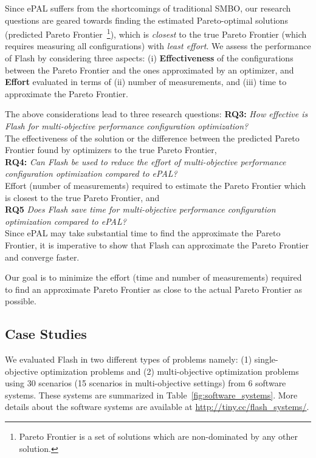 \documentclass[10pt,journal,compsoc]{IEEEtran}
\newcommand{\flash}{{\sc Flash}\xspace}
\begin{document}
Since ePAL suffers from the shortcomings of traditional SMBO, our research questions are geared towards finding the estimated Pareto-optimal solutions (predicted Pareto Frontier~\footnote{Pareto Frontier is a set of solutions which are non-dominated by any other solution.}), which is \textit{closest} to the true Pareto Frontier (which requires measuring all configurations) with \textit{least effort}.  We assess the performance of \flash by considering three aspects: (i) \textbf{Effectiveness} of the configurations between the Pareto Frontier and the ones approximated by an optimizer, and \textbf{Effort} evaluated in terms of (ii) number of measurements, and (iii) time to approximate the Pareto Frontier.

\noindent The above considerations lead to three research questions:
\textbf{RQ3:} \textit{How effective is \flash for multi-objective performance configuration optimization?}\\
The effectiveness of the solution or the difference between the predicted Pareto Frontier found by optimizers to the true Pareto Frontier,\\
\textbf{RQ4:} \textit{Can \flash be used to reduce the effort of multi-objective performance configuration optimization compared to ePAL?}\\
Effort  (number of  measurements)  required to estimate the Pareto Frontier which is closest to the true Pareto Frontier, and\\
\textbf{RQ5} \textit{Does \flash save time for multi-objective performance configuration optimization compared to ePAL? }\\
Since ePAL may take substantial time to find the approximate the Pareto Frontier, it is imperative to show that \flash can approximate the Pareto Frontier and converge faster.

Our goal is to minimize the effort (time and number of measurements) required to find an approximate Pareto Frontier as close to the actual Pareto Frontier as possible.

\subsection{Case Studies}

We evaluated \flash in two different types of problems namely: (1) single-objective optimization problems and (2)  multi-objective optimization problems using 30 scenarios (15 scenarios in multi-objective settings) from 6 software systems. These systems are summarized in Table~\ref{fig:software_systems}.
More details about the software systems are available at \url{http://tiny.cc/flash_systems/}.
\end{document}
